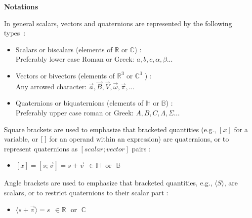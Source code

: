 \documentclass [12pt,a4paper      ]{article}
\newcommand{\bbR}{\mathbb{R}}         %
\newcommand{\bbC}{\mathbb{C}}         %
\newcommand{\bbH}{\mathbb{H}}         %
\newcommand{\bbB}{\mathbb{B}}         %
\newcommand{\SCA}{\langle}            %
\newcommand{\LAR}{\rangle}            %
\newcommand{\Q}{[\hspace{1.mm}]} %
\begin{document}
\newpage


\begin{center}
{\bf \Large Notations}
\end{center}

\noindent In general scalars,  vectors and quaternions are represented  by the following types~:
\begin{itemize}
\item Scalars or biscalars (elements of $\bbR$ or $\bbC$) :\\ Preferably lower case Roman or Greek:  $a, b, c,  \alpha, \beta...$
\item Vectors or bivectors (elements of $\bbR^3$ or $\bbC^3$ ) :\\ Any arrowed character:  $\vec{a}, \vec{B}, \vec{V}, \vec{\omega}, \vec{\pi},...$
\item Quaternions or biquaternions (elements of $\bbH$ or $\bbB$) :\\ Preferably upper case roman or Greek: $A, B, C, \Lambda, \Sigma...$
\end{itemize}

\noindent Square brackets are used to emphasize that bracketed quantities (e.g., $[x]$ for a variable, or $\Q$ for an operand within an expression) are quaternions,  or to represent quaternions as $[scalar; vector]$ pairs :
\begin{itemize}
\item $[x]=[s;\vec{v}]= s+\vec{v} ~~ \in \bbH \text{~~or~~} \bbB$ 
\end{itemize}

\noindent Angle brackets are used to emphasize that bracketed quantities, e.g., $\SCA S \LAR$, are scalars,  or to restrict quaternions to their scalar part :
\begin{itemize}
\item $\SCA s+\vec{v}\LAR = s ~~ \in \bbR \text{~~or~~} \bbC$ 
\end{itemize}
\end{document}
